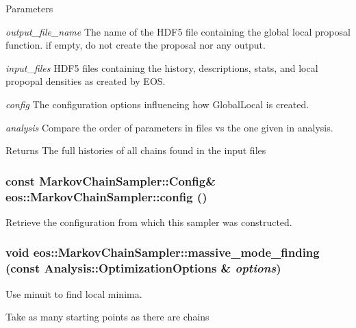 \begin{DoxyParams}{Parameters}
\item[{\em output\_\-file\_\-name}]The name of the HDF5 file containing the global local proposal function. if empty, do not create the proposal nor any output. \item[{\em input\_\-files}]HDF5 files containing the history, descriptions, stats, and local propopal densities as created by EOS. \item[{\em config}]The configuration options influencing how GlobalLocal is created. \item[{\em analysis}]Compare the order of parameters in files vs the one given in analysis. \end{DoxyParams}
\begin{DoxyReturn}{Returns}
The full histories of all chains found in the input files 
\end{DoxyReturn}
\hypertarget{classeos_1_1MarkovChainSampler_a277acc86b109ca342be462c0e9d7c175}{
\subsubsection[{config}]{\setlength{\rightskip}{0pt plus 5cm}const {\bf MarkovChainSampler::Config}\& eos::MarkovChainSampler::config ()}}
\label{classeos_1_1MarkovChainSampler_a277acc86b109ca342be462c0e9d7c175}


Retrieve the configuration from which this sampler was constructed. \hypertarget{classeos_1_1MarkovChainSampler_a1e5ca348ae639a33c3b3db6120ff66f9}{
\subsubsection[{massive\_\-mode\_\-finding}]{\setlength{\rightskip}{0pt plus 5cm}void eos::MarkovChainSampler::massive\_\-mode\_\-finding (const {\bf Analysis::OptimizationOptions} \& {\em options})}}
\label{classeos_1_1MarkovChainSampler_a1e5ca348ae639a33c3b3db6120ff66f9}
Use minuit to find local minima.

Take as many starting points as there are chains


